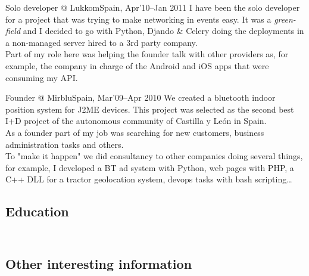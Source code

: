 \documentclass[11pt, a4paper, sans]{moderncv}
\begin{document}
\cventry{}{}
{Solo developer @ Lukkom}{Spain, Apr'10--Jan 2011}
{}
{\vspace{-1em}I have been the solo developer for a project that was trying to make networking in events easy. It was a \textit{green-field} and I decided to go with Python, Djando \& Celery doing the deployments in a non-managed server hired to a 3rd party company.\\
Part of my role here was helping the founder talk with other providers as, for example, the company in charge of the Android and iOS apps that were consuming my API.\\}

\cventry{}{}
{Founder @ Mirblu}{Spain, Mar'09--Apr 2010}
{}
{\vspace{-1em}We created a bluetooth indoor position system for J2ME devices. This project was selected as the second best I+D project of the autonomous community of Castilla y León in Spain.\\ As a founder part of my job was searching for new customers, business administration tasks and others.\\
To "make it happen" we did consultancy to other companies doing several things, for example, I developed a BT ad system with Python, web pages with PHP, a C++ DLL for a tractor geolocation system, devops tasks with bash scripting\ldots\\}


%
%

\subsection{Education}
\vspace{-1em}
\vspace{-1em}

%
%

\subsection{\\Other interesting information}
\end{document}
